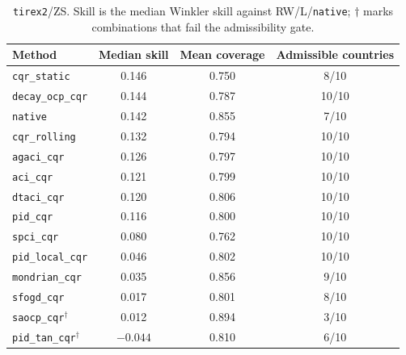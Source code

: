 \begin{table}[t]
\centering
\caption{%
         \texttt{tirex2}/ZS. Skill is the median Winkler skill against
         RW/L/\texttt{native}; $\dagger$ marks combinations that fail the
         admissibility gate.}
\label{tab:res_tirex2_cp}
\begin{tabular}{lccc}
\toprule
Method & Median skill & Mean coverage & Admissible countries \\
\midrule
\texttt{cqr\_static}     & 0.146 & 0.750 & 8/10 \\
\texttt{decay\_ocp\_cqr} & 0.144 & 0.787 & 10/10 \\
\texttt{native}          & 0.142 & 0.855 & 7/10 \\
\texttt{cqr\_rolling}    & 0.132 & 0.794 & 10/10 \\
\texttt{agaci\_cqr}      & 0.126 & 0.797 & 10/10 \\
\texttt{aci\_cqr}        & 0.121 & 0.799 & 10/10 \\
\texttt{dtaci\_cqr}      & 0.120 & 0.806 & 10/10 \\
\texttt{pid\_cqr}        & 0.116 & 0.800 & 10/10 \\
\texttt{spci\_cqr}       & 0.080 & 0.762 & 10/10 \\
\texttt{pid\_local\_cqr} & 0.046 & 0.802 & 10/10 \\
\texttt{mondrian\_cqr}   & 0.035 & 0.856 & 9/10 \\
\texttt{sfogd\_cqr}      & 0.017 & 0.801 & 8/10 \\
\texttt{saocp\_cqr}$^\dagger$    & 0.012 & 0.894 & 3/10 \\
\texttt{pid\_tan\_cqr}$^\dagger$ & $-0.044$ & 0.810 & 6/10 \\
\bottomrule
\end{tabular}
\end{table}

